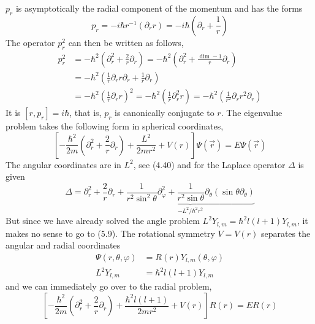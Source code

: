 $p_r$ is asymptotically the radial component of the momentum and has the forms
\begin{equation}
    p_{r}=-i \hbar r^{-1}\left(\partial_{r} r\right)=-i \hbar\left(\partial_{r}+\frac{1}{r}\right)
    \end{equation}
The operator $p^2_r$ can then be written as follows,
\begin{equation}
\begin{aligned} p_{r}^{2} &=-\hbar^{2}\left(\partial_{r}^{2}+\frac{2}{r} \partial_{r}\right)=-\hbar^{2}\left(\partial_{r}^{2}+\frac{\operatorname{dim}-1}{r} \partial_{r}\right) \\ &=-\hbar^{2}\left(\frac{1}{r} \partial_{r} r \partial_{r}+\frac{1}{r} \partial_{r}\right) \\ &=-\hbar^{2}\left(\frac{1}{r} \partial_{r} r\right)^{2}=-\hbar^{2}\left(\frac{1}{r} \partial_{r}^{2} r\right)=-\hbar^{2}\left(\frac{1}{r^{2}} \partial_{r} r^{2} \partial_{r}\right) \end{aligned}
\end{equation}
It is $[r, p_r] = i \hbar$, that is, $p_r$ is canonically conjugate to $r$. The eigenvalue problem takes the following form in spherical coordinates,
\begin{equation}
    \left[-\frac{\hbar^{2}}{2 m}\left(\partial_{r}^{2}+\frac{2}{r} \partial_{r}\right)+\frac{L^{2}}{2 m r^{2}}+V(r)\right] \Psi(\vec{r})=E \Psi(\vec{r})
    \end{equation}
The angular coordinates are in $L^2$, see (4.40) and for the Laplace operator $\Delta$ is given
\begin{equation}
    \Delta=\partial_{r}^{2}+\frac{2}{r} \partial_{r}+\underbrace{\frac{1}{r^{2} \sin ^{2} \theta} \partial_{\varphi}^{2}+\frac{1}{r^{2} \sin \theta} \partial_{\theta}\left(\sin \theta \partial_{\theta}\right)}_{-L^{2} / \hbar^{2} r^{2}}
    \end{equation}
But since we have already solved the angle problem $L^2 Y_{l, m}=\hbar^2 l(l+1)Y_{l,m}$, it makes no sense to go to (5.9). The rotational symmetry $V = V (r)$ separates the angular and radial coordinates
$$
\begin{aligned} \Psi(r, \theta, \varphi) &=R(r) Y_{l, m}(\theta, \varphi) \\ L^{2} Y_{l, m} &=\hbar^{2} l(l+1) Y_{l, m} \end{aligned}
$$
and we can immediately go over to the radial problem,
\begin{equation}
    \left[-\frac{\hbar^{2}}{2 m}\left(\partial_{r}^{2}+\frac{2}{r} \partial_{r}\right)+\frac{\hbar^{2} l(l+1)}{2 m r^{2}}+V(r)\right] R(r)=E R(r)
    \end{equation}
